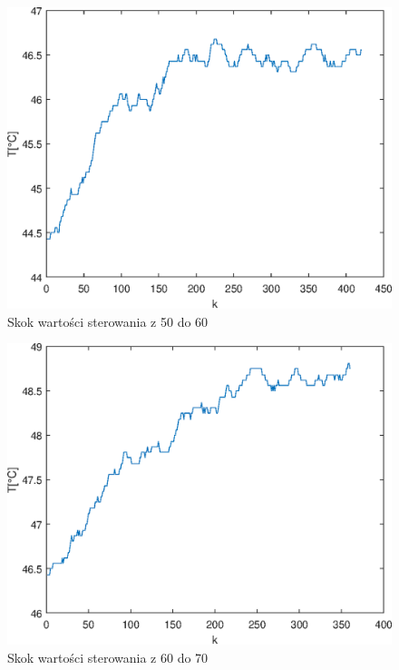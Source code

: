 \begin{figure}[h!]
	\centering
	\includegraphics[scale=1]{Rys/Skok50_60.eps}
	\caption{Skok wartości sterowania z 50 do 60}
	\label{skok4}
\end{figure}

\begin{figure}[h!]
	\centering
	\includegraphics[scale=1]{Rys/Skok60_70.eps}
	\caption{Skok wartości sterowania z 60 do 70}
	\label{skok5}
\end{figure}


